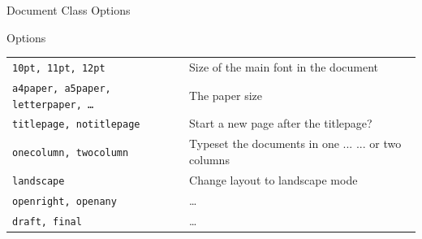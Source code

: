 \documentclass[table]{beamer}
\begin{document}
\begin{frame}{Document Class Options}
    \begin{block}{Options}
    \begin{tabular}{p{10em}p{16em}}
        \texttt{10pt, 11pt, 12pt}        & Size of the main font in the document\\
        \texttt{a4paper, a5paper, letterpaper, \dots}    & The paper size\\
        \texttt{titlepage, notitlepage}  & Start a new page after the titlepage?\\
        \texttt{onecolumn, twocolumn}    & Typeset the documents in one ...
                                            \newline ... or two columns\\
        \texttt{landscape}  & Change layout to landscape mode \\
        \texttt{openright, openany}  & \dots\\
        \texttt{draft, final}  & \dots\\
    \end{tabular}
    \end{block}
\end{frame}


\end{document}
